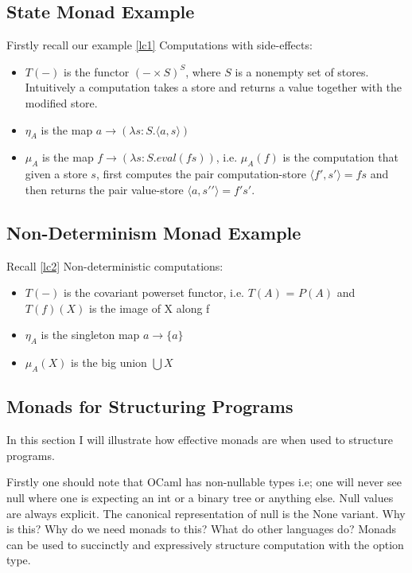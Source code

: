 \documentclass[a4paper,10pt]{article}
\theoremstyle{definition}
\begin{document}
\subsection{State Monad Example}
Firstly recall our example \ref{lc1}
Computations with side-effects:
\begin{itemize}
    \item $T(-)$ is the functor $(-\times S)^S$, where $S$ is a nonempty set of stores.
        Intuitively a computation takes a store and returns a value together with the modified store.
    \item $\eta_A$ is the map $a \rightarrow (\lambda s:S.\langle a,s \rangle)$
    \item $\mu_A$ is the map $f \rightarrow (\lambda s:S.eval(fs))$,
        i.e. $\mu_A(f)$ is the computation that given a store $s$,
        first computes the pair computation-store $\langle f\prime,s\prime\rangle = fs$
        and then returns the pair value-store $\langle a,s\prime\prime\rangle = f\prime s\prime$.
\end{itemize}

\subsection{Non-Determinism Monad Example}
Recall \ref{lc2}
Non-deterministic computations:
\begin{itemize}
    \item $T(-)$ is the covariant powerset functor,
        i.e.  $T(A)$ = $P(A)$ and $T(f)(X)$ is the image of X along f
    \item $\eta_A$ is the singleton map $a \rightarrow  \{a\}$
    \item $\mu_A(X)$ is the big union $\bigcup X$
\end{itemize}


\subsection{Monads for Structuring Programs}
In this section I will illustrate how effective monads are when used to structure programs.

Firstly one should note that OCaml has non-nullable types
i.e; one will never see null where one is expecting an
int or a binary tree or anything else.
Null values are always explicit.
The canonical representation of null is the None variant.
Why is this?
Why do we need monads to this?
What do other languages do?
Monads can be used to succinctly and expressively structure computation with the option type.
\end{document}
